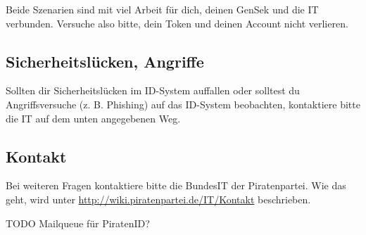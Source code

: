 Beide Szenarien sind mit viel Arbeit für dich, deinen GenSek und die IT verbunden.
Versuche also bitte, dein Token und deinen Account nicht verlieren.

\subsection{Sicherheitslücken, Angriffe}
Sollten dir Sicherheitslücken im ID-System auffallen oder solltest du Angriffsversuche (z. B. Phishing) auf das ID-System beobachten,
kontaktiere bitte die IT auf dem unten angegebenen Weg.

\subsection{Kontakt}
Bei weiteren Fragen kontaktiere bitte die BundesIT der Piratenpartei.
Wie das geht, wird unter \url{http://wiki.piratenpartei.de/IT/Kontakt} beschrieben.

TODO Mailqueue für PiratenID?

